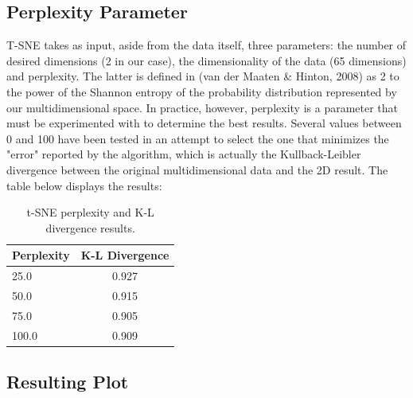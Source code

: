 \documentclass{bigdata}
\begin{document}
\subsection{Perplexity Parameter}
T-SNE takes as input, aside from the data itself, three parameters: the number of desired dimensions (2 in our case), the dimensionality of the data (65 dimensions) and perplexity. The latter is defined in (van der Maaten \& Hinton, 2008) as 2 to the power of the Shannon entropy of the probability distribution represented by our multidimensional space. In practice, however, perplexity is a parameter that must be experimented with to determine the best results. \newline
Several values between 0 and 100 have been tested in an attempt to select the one that minimizes the "error" reported by the algorithm, which is actually the Kullback-Leibler divergence between the original multidimensional data and the 2D result. The table below displays the results:

\begin{table}[h!]
	\begin{center}
		\begin{tabular}{l|c} %
			\textbf{Perplexity} & \textbf{K-L Divergence}\\
			\hline
			25.0 & 0.927\\
			50.0 & 0.915\\
			75.0 & 0.905\\
			100.0& 0.909
		\end{tabular}
	\end{center}
\caption{t-SNE perplexity and K-L divergence results.}
\label{Table 4,}
\end{table}

\subsection{Resulting Plot}
\end{document}
